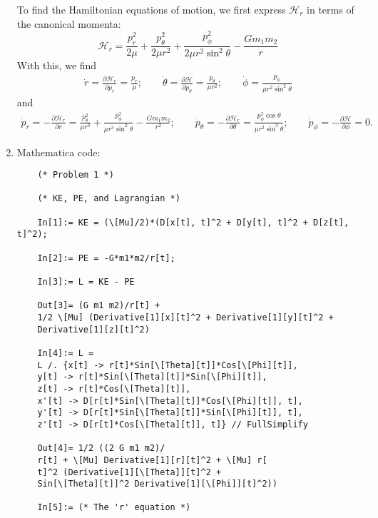 \documentclass{article}
\theoremstyle{definition}
\newcommand{\p}{\partial}
\newcommand{\ham}{\mathcal{H}}
\newcommand{\f}[2]{\frac{#1}{#2}}
\begin{document}
\begin{enumerate}[label=(\alph*)]
	To find the Hamiltonian equations of motion, we first express $\ham_r$ in terms of the canonical momenta:
	\begin{equation*}
	\ham_r = \f{p_r^2}{2\mu} + \f{p_\theta^2}{2\mu r^2} + \f{p_\phi^2}{2\mu r^2\sin^2\theta} - \f{G m_1m_2}{r}
	\end{equation*}
	With this, we find
	\begin{align*}
	\dot{r} = \f{\p \ham_r }{\p p_r} = \f{p_r}{\mu}; 
	\quad\quad 
	\dot{\theta} = \f{\p \ham}{\p p_\theta} = \f{p_\theta}{\mu r^2}; 
	\quad\quad 
	\dot{\phi} = \f{p_\phi}{\mu r^2 \sin^2\theta}
	\end{align*}
	and 
	\begin{align*}
	\dot{p}_r = -\f{\p \ham_r}{\p r} = \f{p_\theta^2}{\mu r^3} + \f{p_\phi^2}{\mu r^3\sin^2\theta} - \f{Gm_1m_2}{r^2}; 
	\quad\quad 
	\dot{p}_\theta = -\f{\p\ham_r}{\p \theta}  = \f{p_\phi^2\cos\theta}{\mu r^2\sin^3\theta}; 
	\quad\quad \dot{p}_\phi = - \f{\p \ham}{\p \phi} = 0.
	\end{align*}

	
	
	
	
	
	
	
	
	
	
	
	
	\item 
	Mathematica code: 
	\begin{lstlisting}
	(* Problem 1 *)
	
	(* KE, PE, and Lagrangian *)
	
	In[1]:= KE = (\[Mu]/2)*(D[x[t], t]^2 + D[y[t], t]^2 + D[z[t], t]^2);
	
	In[2]:= PE = -G*m1*m2/r[t];
	
	In[3]:= L = KE - PE
	
	Out[3]= (G m1 m2)/r[t] + 
	1/2 \[Mu] (Derivative[1][x][t]^2 + Derivative[1][y][t]^2 + 
	Derivative[1][z][t]^2)
	
	In[4]:= L = 
	L /. {x[t] -> r[t]*Sin[\[Theta][t]]*Cos[\[Phi][t]], 
	y[t] -> r[t]*Sin[\[Theta][t]]*Sin[\[Phi][t]], 
	z[t] -> r[t]*Cos[\[Theta][t]],
	x'[t] -> D[r[t]*Sin[\[Theta][t]]*Cos[\[Phi][t]], t], 
	y'[t] -> D[r[t]*Sin[\[Theta][t]]*Sin[\[Phi][t]], t], 
	z'[t] -> D[r[t]*Cos[\[Theta][t]], t]} // FullSimplify
	
	Out[4]= 1/2 ((2 G m1 m2)/
	r[t] + \[Mu] Derivative[1][r][t]^2 + \[Mu] r[
	t]^2 (Derivative[1][\[Theta]][t]^2 + 
	Sin[\[Theta][t]]^2 Derivative[1][\[Phi]][t]^2))
	
	In[5]:= (* The 'r' equation *)
	

\end{lstlisting}
\end{enumerate}
\end{document}
